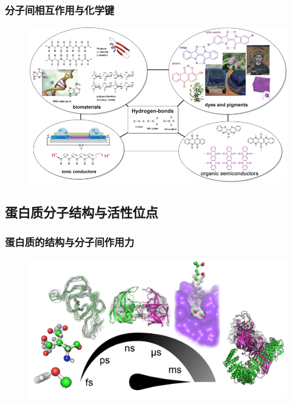 \frame
{
	\frametitle{分子间相互作用与化学键}
\begin{figure}[h!]
\centering
\vspace{-25.5pt}
\includegraphics[height=0.67\textwidth,width=1.0\textwidth,viewport=0 0 830 500,clip]{Figures/Bio-H-bond-1.png}
\label{Bio-H-bond}
\end{figure}
}

\subsection{蛋白质分子结构与活性位点}
\frame
{
	\frametitle{蛋白质的结构与分子间作用力}
\begin{figure}[h!]
\centering
\vspace{-25.5pt}
\includegraphics[height=0.67\textwidth,width=1.0\textwidth,viewport=0 0 470 290,clip]{Figures/Protein-structure.png}
\label{Protein-structure-1}
\end{figure}
}

